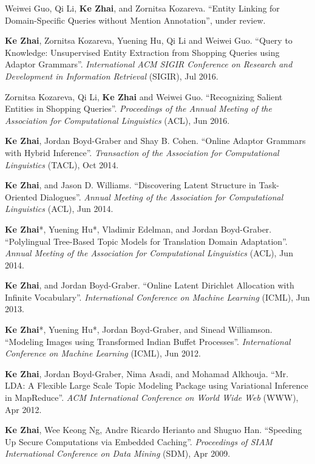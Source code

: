 \documentclass{style/resume}
\begin{document}
\begin{resume}
  Weiwei Guo, Qi Li, {\bf Ke Zhai}, and Zornitsa Kozareva. ``Entity
  Linking for Domain-Specific Queries without Mention
  Annotation'', under review.

  {\bf Ke Zhai}, Zornitsa Kozareva, Yuening Hu, Qi Li and Weiwei
  Guo. ``Query to Knowledge: Unsupervised Entity Extraction from
  Shopping Queries using Adaptor Grammars''. {\it International ACM
    SIGIR Conference on Research and Development in Information
    Retrieval} (SIGIR), Jul 2016.

  Zornitsa Kozareva, Qi Li, {\bf Ke Zhai} and Weiwei
  Guo. ``Recognizing Salient Entities in Shopping Queries''. {\it
    Proceedings of the Annual Meeting of the Association for
    Computational Linguistics} (ACL), Jun 2016.

  {\bf Ke Zhai}, Jordan Boyd-Graber and Shay B. Cohen. ``Online
  Adaptor Grammars with Hybrid Inference''. {\it Transaction of the Association
    for Computational Linguistics} (TACL), Oct 2014.

  {\bf Ke Zhai}, and Jason D. Williams. ``Discovering Latent Structure
  in Task-Oriented Dialogues''. {\it Annual Meeting of the Association
    for Computational Linguistics} (ACL), Jun 2014.

  {\bf Ke Zhai}*, Yuening Hu*, Vladimir Edelman, and Jordan
  Boyd-Graber. ``Polylingual Tree-Based Topic Models for Translation
  Domain Adaptation''. {\it Annual Meeting of the Association for
    Computational Linguistics} (ACL), Jun 2014.

  {\bf Ke Zhai}, and Jordan Boyd-Graber. ``Online Latent Dirichlet
  Allocation with Infinite Vocabulary''. {\it International Conference
    on Machine Learning} (ICML), Jun 2013.

  {\bf Ke Zhai}*, Yuening Hu*, Jordan Boyd-Graber, and Sinead
  Williamson. ``Modeling Images using Transformed Indian Buffet
  Processes''. {\it International Conference on Machine Learning}
  (ICML), Jun 2012.

  {\bf Ke Zhai}, Jordan Boyd-Graber, Nima Asadi, and Mohamad
  Alkhouja. ``Mr. LDA: A Flexible Large Scale Topic Modeling Package
  using Variational Inference in MapReduce''. {\it ACM International
    Conference on World Wide Web} (WWW), Apr 2012.

  {\bf Ke Zhai}, Wee Keong Ng, Andre Ricardo Herianto and Shuguo
  Han. ``Speeding Up Secure Computations via Embedded Caching''. {\it
    Proceedings of SIAM International Conference on Data Mining}
  (SDM), Apr 2009.


\end{resume}
\end{document}
